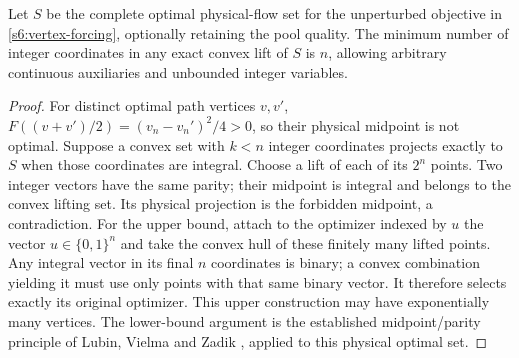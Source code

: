 \begin{corollary}\label{s6:integer-lift}
Let $S$ be the complete optimal physical-flow set for the unperturbed
objective in \cref{s6:vertex-forcing}, optionally retaining the pool quality.
The minimum number of integer coordinates in any exact convex lift of
$S$ is $n$, allowing arbitrary continuous auxiliaries and unbounded
integer variables.
\end{corollary}
\begin{proof}
For distinct optimal path vertices $v,v'$,
$F((v+v')/2)=(v_n-v_n')^2/4>0$, so their physical midpoint is not
optimal. Suppose a convex set with $k<n$ integer coordinates projects
exactly to $S$ when those coordinates are integral. Choose a lift of
each of its $2^n$ points. Two integer vectors have the same parity;
their midpoint is integral and belongs to the convex lifting set.
Its physical projection is the forbidden midpoint, a contradiction.
For the upper bound, attach to the optimizer indexed by $u$ the vector
$u\in\{0,1\}^n$ and take the convex hull of these finitely many lifted
points. Any integral vector in its final $n$ coordinates is binary;
a convex combination yielding it must use only points with that same
binary vector. It therefore selects exactly its original optimizer.
This upper construction may have exponentially many vertices.
The lower-bound argument is the established midpoint/parity principle
of Lubin, Vielma and Zadik \cite[Section~4.2]{s6:lubin2022}, applied to
this physical optimal set.
\end{proof}

